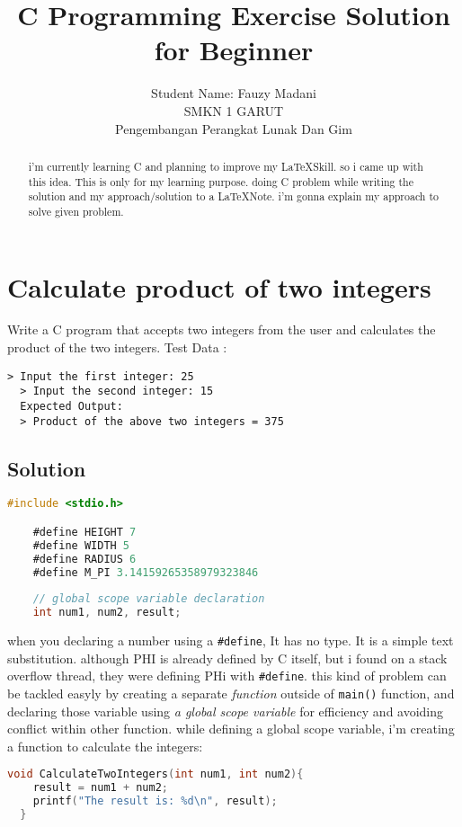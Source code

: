 \documentclass{article}
\title{C Programming Exercise Solution for Beginner}
\begin{document}
  \author{
		Student Name: Fauzy Madani \\ 
		SMKN 1 GARUT \\
		Pengembangan Perangkat Lunak Dan Gim }

  \maketitle

  \tableofcontents

  \clearpage

  \begin{abstract}
  i'm currently learning C and planning to improve my \LaTeX Skill. so i came up with this idea. This is only for my learning purpose. doing C problem while writing the solution and
  my approach/solution to a \LaTeX Note. i'm gonna explain my approach to solve given problem.
  \end{abstract}

  \section{Calculate product of two integers}
  
  Write a C program that accepts two integers from the user and calculates the product of the two integers.
  Test Data :
  
  \begin{lstlisting}[style=plainstyle]
  > Input the first integer: 25
  > Input the second integer: 15
  Expected Output:
  > Product of the above two integers = 375
  \end{lstlisting}
  
  \subsection{Solution}
  \begin{lstlisting}[language=C, caption=Defining required Variable]
    #include <stdio.h>

    #define HEIGHT 7
    #define WIDTH 5
    #define RADIUS 6
    #define M_PI 3.14159265358979323846
    
    // global scope variable declaration
    int num1, num2, result;
  \end{lstlisting}
  
  when you declaring a number using a \texttt{\#define}, It has no type. It is a simple text substitution. although PHI is already defined by C itself, but i found on a stack overflow thread, they were defining PHi with \texttt{\#define}.
  this kind of problem can be tackled easyly by creating a separate \textit{function} outside of \texttt{main()} function, and declaring those variable using \textit{a global scope variable} for efficiency and avoiding conflict within other function. 
  while defining a global scope variable, i'm creating a function to calculate the integers:
  \begin{lstlisting}[language=C, caption=function]
  void CalculateTwoIntegers(int num1, int num2){
    result = num1 + num2;
    printf("The result is: %d\n", result);
  }
  \end{lstlisting}
\end{document}
